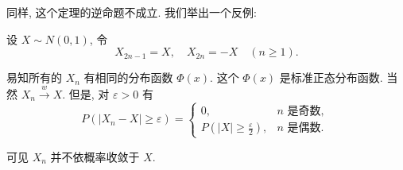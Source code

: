 同样, 这个定理的逆命题不成立. 我们举出一个反例: 

\begin{example}
    设 $X \sim N(0,1)$, 令
$$
X_{2 n-1}=X, \quad X_{2 n}=-X \quad(n \geqslant 1) .
$$

易知所有的 $X_n$ 有相同的分布函数 $\Phi(x)$. 这个 $\Phi(x)$ 是标准正态分布函数. 当然 $X_n \stackrel{w}{\longrightarrow} X$. 但是, 对 $\varepsilon>0$ 有
$$
P\left(\left|X_n-X\right| \geqslant \varepsilon\right)= \begin{cases}0, & n \text { 是奇数, } \\ P\left(|X| \geqslant \frac{\varepsilon}{2}\right), & n \text { 是偶数. }\end{cases}
$$

可见 $X_n$ 并不依概率收敛于 $X$.
\end{example}


